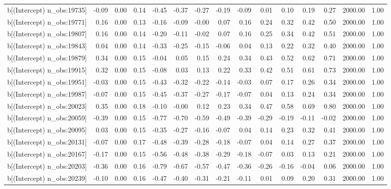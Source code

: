 \begin{table}[ht]
\begin{tabular}{rrrrrrrrrrrrrrr}
  b[(Intercept) n\_obs:19735] & -0.09 & 0.00 & 0.14 & -0.45 & -0.37 & -0.27 & -0.19 & -0.09 & 0.01 & 0.10 & 0.19 & 0.27 & 2000.00 & 1.00 \\ 
  b[(Intercept) n\_obs:19771] & 0.16 & 0.00 & 0.13 & -0.16 & -0.09 & -0.00 & 0.07 & 0.16 & 0.24 & 0.32 & 0.42 & 0.50 & 2000.00 & 1.00 \\ 
  b[(Intercept) n\_obs:19807] & 0.16 & 0.00 & 0.14 & -0.20 & -0.11 & -0.02 & 0.07 & 0.16 & 0.25 & 0.34 & 0.42 & 0.51 & 2000.00 & 1.00 \\ 
  b[(Intercept) n\_obs:19843] & 0.04 & 0.00 & 0.14 & -0.33 & -0.25 & -0.15 & -0.06 & 0.04 & 0.13 & 0.22 & 0.32 & 0.40 & 2000.00 & 1.00 \\ 
  b[(Intercept) n\_obs:19879] & 0.34 & 0.00 & 0.15 & -0.04 & 0.05 & 0.15 & 0.24 & 0.34 & 0.43 & 0.52 & 0.62 & 0.71 & 2000.00 & 1.00 \\ 
  b[(Intercept) n\_obs:19915] & 0.32 & 0.00 & 0.15 & -0.08 & 0.03 & 0.13 & 0.22 & 0.33 & 0.42 & 0.51 & 0.61 & 0.73 & 2000.00 & 1.00 \\ 
  b[(Intercept) n\_obs:19951] & -0.03 & 0.00 & 0.15 & -0.43 & -0.32 & -0.22 & -0.14 & -0.03 & 0.07 & 0.17 & 0.26 & 0.34 & 2000.00 & 1.00 \\ 
  b[(Intercept) n\_obs:19987] & -0.07 & 0.00 & 0.15 & -0.45 & -0.37 & -0.27 & -0.17 & -0.07 & 0.04 & 0.13 & 0.24 & 0.34 & 2000.00 & 1.00 \\ 
  b[(Intercept) n\_obs:20023] & 0.35 & 0.00 & 0.18 & -0.10 & -0.00 & 0.12 & 0.23 & 0.34 & 0.47 & 0.58 & 0.69 & 0.80 & 2000.00 & 1.00 \\ 
  b[(Intercept) n\_obs:20059] & -0.39 & 0.00 & 0.15 & -0.77 & -0.70 & -0.59 & -0.49 & -0.39 & -0.29 & -0.19 & -0.11 & -0.02 & 2000.00 & 1.00 \\ 
  b[(Intercept) n\_obs:20095] & 0.03 & 0.00 & 0.15 & -0.35 & -0.27 & -0.16 & -0.07 & 0.04 & 0.14 & 0.23 & 0.32 & 0.41 & 2000.00 & 1.00 \\ 
  b[(Intercept) n\_obs:20131] & -0.07 & 0.00 & 0.17 & -0.48 & -0.39 & -0.28 & -0.18 & -0.07 & 0.04 & 0.14 & 0.27 & 0.37 & 2000.00 & 1.00 \\ 
  b[(Intercept) n\_obs:20167] & -0.17 & 0.00 & 0.15 & -0.56 & -0.48 & -0.38 & -0.29 & -0.18 & -0.07 & 0.03 & 0.13 & 0.21 & 2000.00 & 1.00 \\ 
  b[(Intercept) n\_obs:20203] & -0.36 & 0.00 & 0.16 & -0.79 & -0.67 & -0.57 & -0.47 & -0.36 & -0.26 & -0.16 & -0.04 & 0.06 & 2000.00 & 1.00 \\ 
  b[(Intercept) n\_obs:20239] & -0.10 & 0.00 & 0.16 & -0.47 & -0.40 & -0.31 & -0.21 & -0.11 & 0.01 & 0.09 & 0.20 & 0.31 & 2000.00 & 1.00 \\ 

\end{tabular}
\end{table}
